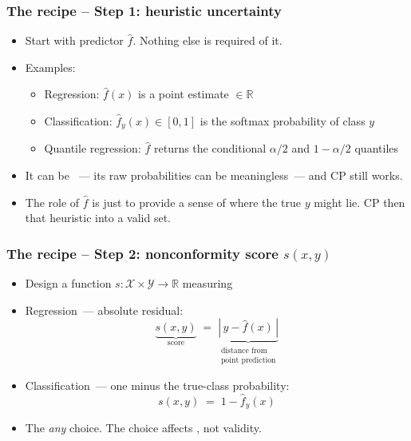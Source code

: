 \documentclass[11pt, aspectratio=169, xcolor={dvipsnames}, usepdftitle=false]{beamer}
\begin{document}
\begin{frame}
\frametitle{The recipe -- Step 1: heuristic uncertainty}
\begin{itemize}
\item Start with  predictor $\hat{f}$. Nothing else is required of it.
\item Examples:
\begin{itemize}
\item Regression: $\hat{f}(x)$ is a point estimate $\in \mathbb{R}$
\item Classification: $\hat{f}_y(x) \in [0,1]$ is the softmax probability of class $y$
\item Quantile regression: $\hat{f}$ returns the conditional $\alpha/2$ and $1-\alpha/2$ quantiles
\end{itemize}
\item {} It can be ~--- its raw probabilities can be meaningless~--- and CP still works.
\item The role of $\hat{f}$ is just to provide a  sense of where the true $y$ might lie. CP then  that heuristic into a valid set.
\end{itemize}
\end{frame}

\begin{frame}
\frametitle{The recipe -- Step 2: nonconformity score $s(x,y)$}
\begin{itemize}
\item Design a function $s: \mathcal{X} \times \mathcal{Y} \to \mathbb{R}$ measuring 
\item Regression~--- absolute residual:
\begin{equation*}
\underbrace{s(x, y)}_{\text{score}}
\;=\;
\underbrace{|\,y - \hat{f}(x)\,|}_{\substack{\text{distance from}\\\text{point prediction}}}
\end{equation*}
\item Classification~--- one minus the true-class probability:
\begin{equation*}
s(x, y) \;=\; 1 - \hat{f}_y(x)
\end{equation*}
\item {} The  \emph{any} choice. The choice affects , not validity.
\end{itemize}
\end{frame}
\end{document}

